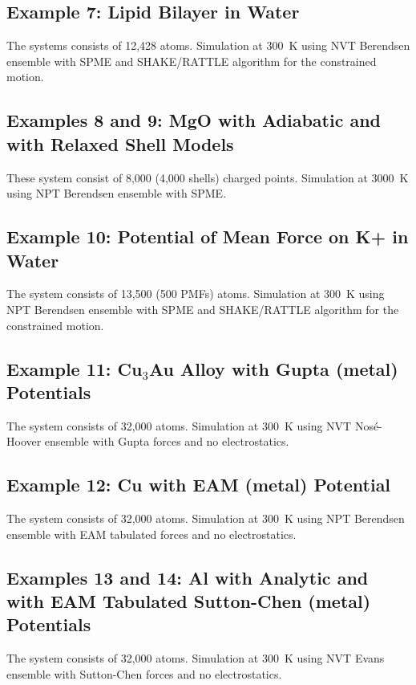 \subsection{Example 7: Lipid Bilayer in Water}

The systems consists of 12,428 atoms.  Simulation at 300~K using NVT
Berendsen ensemble with SPME and SHAKE/RATTLE algorithm for the constrained motion.

\subsection{Examples 8 and 9: MgO with Adiabatic and with Relaxed Shell Models}

These system consist of 8,000 (4,000 shells) charged points.  Simulation
at 3000~K using NPT Berendsen ensemble with SPME.

\subsection{Example 10: Potential of Mean Force on K+ in Water}

The system consists of 13,500 (500 PMFs) atoms.  Simulation at 300~K
using NPT Berendsen ensemble with SPME and SHAKE/RATTLE algorithm for
the constrained motion.

\subsection{Example 11: Cu$_{3}$Au Alloy with Gupta (metal) Potentials}

The system consists of 32,000 atoms.  Simulation at 300~K using NVT
Nos\'e-Hoover ensemble with Gupta forces and no electrostatics.

\subsection{Example 12: Cu with EAM (metal) Potential}

The system consists of 32,000 atoms.  Simulation at 300~K using NPT
Berendsen ensemble with EAM tabulated forces and no electrostatics.

\subsection{Examples 13 and 14: Al with Analytic and with EAM Tabulated Sutton-Chen (metal) Potentials}

The system consists of 32,000 atoms.  Simulation at 300~K using NVT
Evans ensemble with Sutton-Chen forces and no electrostatics.

